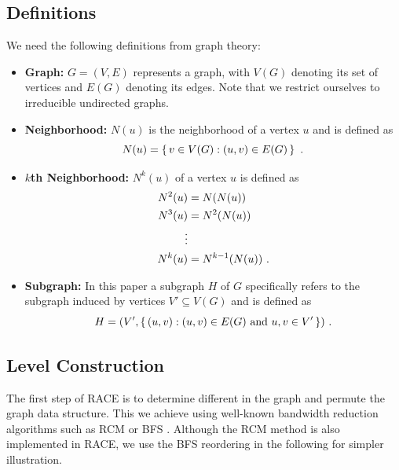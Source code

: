 \subsection*{Definitions}
We need the following definitions from graph theory:
\begin{itemize}
	\item \textbf{Graph: } $G = (V,E)$ represents a graph, with $V(G)$
              denoting its set of vertices and $E(G)$ denoting its edges. Note that
              we restrict ourselves to irreducible undirected graphs.
	\item \textbf{Neighborhood:} $N(u)$ is the neighborhood of a vertex $u$ and is defined as
	\begin{equation*}
	  N(u) = \set{ v \in V(G) : (u,v) \in E(G)}~.
	\end{equation*}
	\item \textbf{$k$th Neighborhood:} $N^{k}(u)$ of a vertex $u$ is defined as
	 \begin{align*}
	 	N^2(u) &= N(N(u))  \\
	 	N^3(u) &= N^2(N(u)) \\
	 	\vdots\\
	 	N^k(u) &= N^{k-1}(N(u)) ~.
	 \end{align*}
	\item \textbf{Subgraph:} In this paper a subgraph $H$ of $G$ specifically
              refers to the subgraph induced by vertices $V' \subseteq V(G)$ and is defined as
	\begin{equation*}
		H = (V', \set{ (u,v) : (u,v) \in E(G) \text{ and } u,v \in V'})~.
	\end{equation*}
\end{itemize}

\subsection{Level Construction}\label{subsec:LEVEL_CONST}

The first step of \acrshort{RACE} is to determine
different \textit{\levels} in the graph and permute the
graph data structure. This we achieve using
well-known bandwidth reduction algorithms such as \acrfull{RCM} \cite{RCM}
or \acrfull{BFS} \cite{BFS}\@. Although the RCM method is
also implemented in \acrshort{RACE}, we use the \acrshort{BFS}
reordering in the following for simpler illustration.


